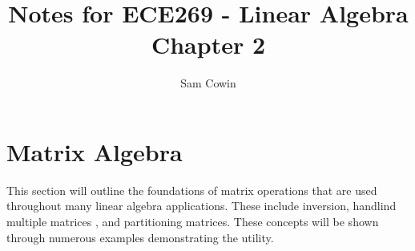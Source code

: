 \documentclass[12pt]{article}
\begin{document}
\setlength{\abovedisplayskip}{0pt}
\setlength{\belowdisplayskip}{0pt}
\setlength{\abovedisplayshortskip}{0pt}
\setlength{\belowdisplayshortskip}{0pt}
    
\title{Notes for ECE269 - Linear Algebra \\
\large Chapter 2}
\author{Sam Cowin}
\maketitle

\section{Matrix Algebra}
This section will outline the foundations of matrix operations that are used throughout many linear algebra applications. These include inversion, handlind multiple matrices %
, and partitioning matrices. These concepts will be shown through numerous examples demonstrating the utility.
\end{document}
